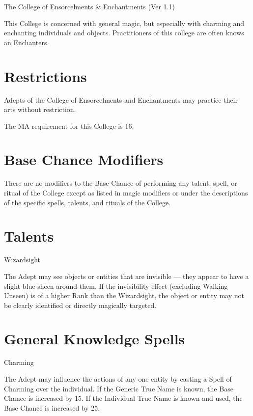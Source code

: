 \begin{Chapter}{The College of Ensorcelments \& Enchantments (Ver 1.1)}

This College is concerned with general magic, but especially with
charming and enchanting individuals and objects.  Practitioners of
this college are often knows an Enchanters.


\section{Restrictions}

Adepts of the College of Ensorcelments and Enchantments may practice
their arts without restriction.

The MA requirement for this College is 16. 


\section{Base Chance Modifiers}

There are no modifiers to the Base Chance of performing any talent,
spell, or ritual of the College except as listed in magic modifiers or
under the descriptions of the specific spells, talents, and rituals of
the College.


\section{Talents}

\begin{talent}[T-1]{Wizardsight }

\begin{effects}
The Adept may see objects or entities that are invisible — they appear
to have a slight blue sheen around them.  If the invisibility effect
(excluding Walking Unseen) is of a higher Rank than the Wizardsight,
the object or entity may not be clearly identified or directly
magically targeted.
\end{effects}
\end{talent}


\section{General Knowledge Spells}

\begin{spell}[G-1]{Charming}
\begin{effects}
The Adept may influence the actions of any one entity by casting a
Spell of Charming over the individual. If the Generic True Name is
known, the Base Chance is increased by 15. If the Individual True Name
is known and used, the Base Chance is increased by 25.


\end{effects}
\end{spell}
\end{Chapter}

